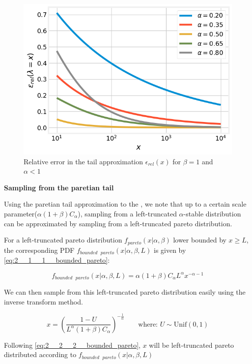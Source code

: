 \documentclass[../main.tex]{subfiles}
\begin{document}
\begin{figure}[h!]
	\centering
	\includegraphics[width=12.0cm]{../plots/2__1__1__tail_approx.png}
	\caption{Relative error in the tail approximation $\epsilon_{rel}(x)$ for $\beta = 1$ and $\alpha < 1$}
	\label{fig:2__1__1__tail_approx}
\end{figure}

\textbf{Sampling from the paretian tail}

Using the paretian tail approximation to the \asd, we note that up to a certain scale parameter($\alpha (1+\beta) C_\alpha$), sampling from a left-truncated $\alpha$-stable distribution can be approximated by sampling from a left-truncated pareto distribution. 

For a left-truncated pareto distribution $f_{pareto}(x | \alpha, \beta)$ lower bounded by $x \geq L$, the corresponding PDF $f_{bounded \text{ }pareto}(x | \alpha, \beta, L)$ is given by \autoref{eq:2__1__1__bounded_pareto}:

\begin{equation}
	f_{bounded \text{ }pareto}(x | \alpha, \beta, L) =  \alpha (1+\beta) C_\alpha L^\alpha x^{-\alpha -1} \label{eq:2__1__1__bounded_pareto}
\end{equation}

We can then sample from this left-truncated pareto distribution easily using the inverse transform method. 

\begin{equation}
x = \left( \frac{1-U }{L^\alpha (1+\beta) C_\alpha} \right) ^ {-\frac{1}{\alpha}}  \qquad \text{where: } U \sim \text{Unif}(0,1)
\label{eq:2__2__2__bounded_pareto}
\end{equation}

Following \autoref{eq:2__2__2__bounded_pareto}, $x$ will be left-truncated pareto distributed according to $f_{bounded \text{ }pareto}(x | \alpha, \beta, L)$ 
	
\end{document}
